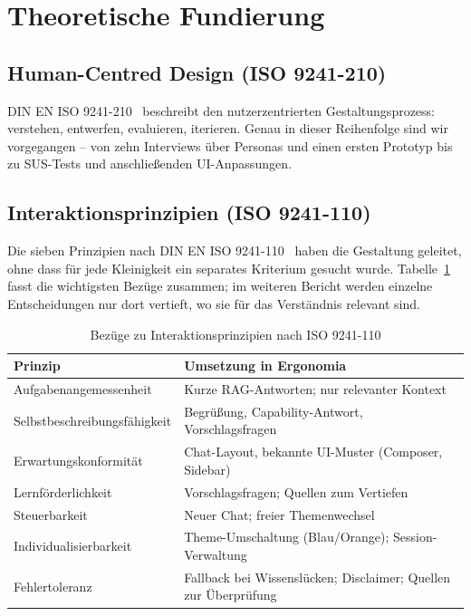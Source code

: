\section{Theoretische Fundierung}

\subsection{Human-Centred Design (ISO 9241-210)}

DIN EN ISO 9241-210~\cite{iso9241-210} beschreibt den nutzerzentrierten Gestaltungsprozess: verstehen, entwerfen, evaluieren, iterieren. Genau in dieser Reihenfolge sind wir vorgegangen -- von zehn Interviews über Personas und einen ersten Prototyp bis zu SUS-Tests und anschließenden UI-Anpassungen.

\subsection{Interaktionsprinzipien (ISO 9241-110)}

Die sieben Prinzipien nach DIN EN ISO 9241-110~\cite{iso9241} haben die Gestaltung geleitet, ohne dass für jede Kleinigkeit ein separates Kriterium gesucht wurde. Tabelle~\ref{tab:iso110} fasst die wichtigsten Bezüge zusammen; im weiteren Bericht werden einzelne Entscheidungen nur dort vertieft, wo sie für das Verständnis relevant sind.

\begin{table}[htbp]
\centering
\caption{Bezüge zu Interaktionsprinzipien nach ISO 9241-110}
\label{tab:iso110}
\begin{tabularx}{\textwidth}{@{}l X@{}}
\toprule
\textbf{Prinzip} & \textbf{Umsetzung in Ergonomia} \\
\midrule
Aufgabenangemessenheit & Kurze RAG-Antworten; nur relevanter Kontext \\
Selbstbeschreibungsfähigkeit & Begrüßung, Capability-Antwort, Vorschlagsfragen \\
Erwartungskonformität & Chat-Layout, bekannte UI-Muster (Composer, Sidebar) \\
Lernförderlichkeit & Vorschlagsfragen; Quellen zum Vertiefen \\
Steuerbarkeit & Neuer Chat; freier Themenwechsel \\
Individualisierbarkeit & Theme-Umschaltung (Blau/Orange); Session-Verwaltung \\
Fehlertoleranz & Fallback bei Wissenslücken; Disclaimer; Quellen zur Überprüfung \\
\bottomrule
\end{tabularx}
\end{table}

